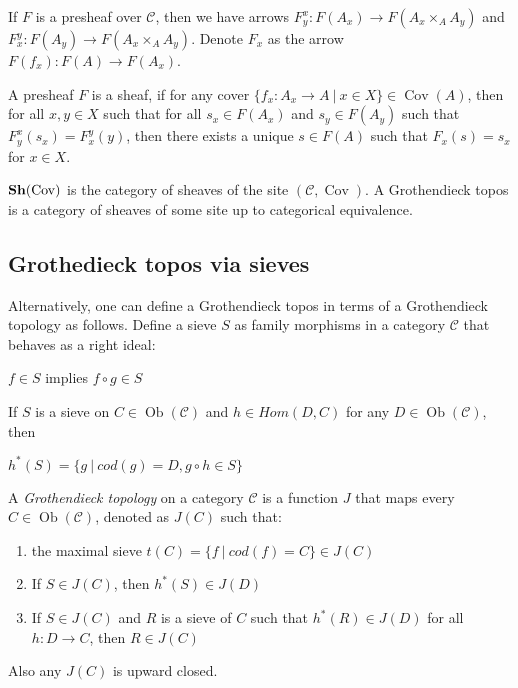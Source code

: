 \documentclass[a4paper]{article}
\theoremstyle{defin}
\theoremstyle{theorem}
\theoremstyle{claim}
\theoremstyle{prop}
\theoremstyle{lemma}
\theoremstyle{fact}
\theoremstyle{ex}
\theoremstyle{col}
\begin{document}
\centerline{
}

If $F$ is a presheaf over $\mathcal{C}$, then we have arrows $F^x_y : F(A_x) \to F(A_x \times_A A_y)$ and $F^y_x : F(A_y) \to F(A_x \times_A A_y)$. Denote $F_x$ as the arrow $F(f_x) : F(A) \to F(A_x)$.



A presheaf $F$ is a sheaf, if for any cover $\{ f_x : A_x \to A \: | \: x \in X \} \in \operatorname{Cov}(A)$, then for all $x, y \in X$ such that for all $s_x \in F(A_x)$ and $s_y \in F(A_y)$ such that $F^x_y(s_x) = F^y_x(y)$, then there exists a unique $s \in F(A)$ such that $F_x(s) = s_x$ for $x \in X$.

${\bf Sh}(\operatorname{Cov})$ is the category of sheaves of the site $(\mathcal{C}, \operatorname{Cov})$. A Grothendieck topos is a category of sheaves of some site up to categorical equivalence.

\subsection{Grothedieck topos via sieves}

Alternatively, one can define a Grothendieck topos in terms of a Grothendieck topology as follows. Define a sieve $S$
as family morphisms in a category $\mathcal{C}$ that behaves as a right ideal:

\begin{center}
$f \in S$ implies $f \circ g \in S$
\end{center}

If $S$ is a sieve on $C \in \operatorname{Ob}(\mathcal{C})$ and $h \in Hom(D, C)$ for any $D \in \operatorname{Ob}(\mathcal{C})$, then
\begin{center}
$h^*(S) = \{ g \: | \: cod(g) = D, g \circ h \in S \}$
\end{center}

A \emph{Grothendieck topology} on a category $\mathcal{C}$ is a function $J$ that maps every $C \in \operatorname{Ob}(\mathcal{C})$, denoted as $J(C)$ such that:
\begin{enumerate}
\item the maximal sieve $t(C) = \{ f \: | \: cod(f) = C\} \in J(C)$
\item If $S \in J(C)$, then $h^*(S) \in J(D)$
\item If $S \in J(C)$ and $R$ is a sieve of $C$ such that $h^*(R) \in J(D)$ for all $h : D \to C$, then $R \in J(C)$
\end{enumerate}
Also any $J(C)$ is upward closed.
\end{document}
